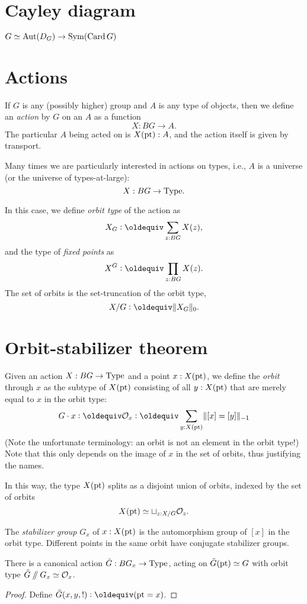\section{Cayley diagram}

$G \simeq \operatorname{Aut}(D_G) \to \operatorname{Sym}(\operatorname{Card} G)$

\section{Actions}

If $G$ is any (possibly higher) group and $A$ is any type of objects,
then we define an \emph{action} by $G$ on an $A$ as a function
\[
  X : BG \to A.
\]
The particular $A$ being acted on is $X({\mathord{\mathrm{pt}}}):A$,
and the action itself is given by transport.

Many times we are particularly interested in actions on types,
i.e., $A$ is a universe (or the universe of types-at-large):
\[
  X : BG \to \mathord{\mathrm{Type}}.
\]

In this case, we define \emph{orbit type} of the action as
\[
  X_G \defeq \sum_{z:BG} X(z),
\]
and the type of \emph{fixed points} as
\[
  X^G \defeq \prod_{z:BG} X(z).
\]
The set of orbits is the set-truncation of the orbit type,
\[
  X / G \defeq \Trunc{X_G}_0.
\]

\section{Orbit-stabilizer theorem}

Given an action $X : BG \to \mathord{\mathrm{Type}}$ and a point $x : X({\mathord{\mathrm{pt}}})$, we define
the \emph{orbit} through $x$ as the subtype of $X({\mathord{\mathrm{pt}}})$ consisting of
all $y : X({\mathord{\mathrm{pt}}})$ that are merely equal to $x$ in the orbit type:
\[
  G\cdot x \defeq \mathcal O_x \defeq \sum_{y : X(\pt)} \merely{[x] = [y]}
\]
(Note the unfortunate terminology: an orbit is not an element in the
orbit type!)
Note that this only depends on the image of $x$ in the set of orbits,
thus justifying the names.

In this way, the type $X({\mathord{\mathrm{pt}}})$ splits as a disjoint union of orbits,
indexed by the set of orbits
\[
  X({\mathord{\mathrm{pt}}}) \simeq \sqcup_{z : X / G} \mathcal O_z.
\]

The \emph{stabilizer group} $G_x$ of $x : X({\mathord{\mathrm{pt}}})$ is the automorphism group of $[x]$ in the orbit type.
Different points in the same orbit have conjugate stabilizer groups.

\begin{theorem}
  There is a canonical action $\tilde G : BG_x \to \mathord{\mathrm{Type}}$,
  acting on $\tilde G({\mathord{\mathrm{pt}}})\simeq G$
  with orbit type $\tilde G\mathbin{/\kern-3pt/} G_x \simeq \mathcal O_x$.
\end{theorem}
\begin{proof}
  Define $\tilde G(x,y,!) \defeq (\pt = x)$.
\end{proof}

